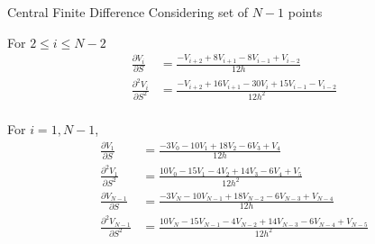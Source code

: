 \documentclass{beamer}
\begin{document}

\begin{frame}{Central Finite Difference}
Considering set of $N-1$ points

\small
For $2 \le i \le N-2$
\begin{align*}
    \frac{\partial V_i}{\partial S} &= \frac{-V_{i+2}+8V_{i+1}-8V_{i-1}+V_{i-2}}{12h}\\
    \frac{\partial^2 V_i}{\partial S^2} &= \frac{-V_{i+2}+16V_{i+1}-30V_i+15V_{i-1}-V_{i-2}}{12h^2}\\
\end{align*}

For $i=1,N-1$,
\begin{align*}
    \frac{\partial V_1}{\partial S} &= \frac{-3V_{0}-10V_{1}+18V_{2}-6V_{3}+V_4}{12h}\\
    \frac{\partial^2 V_1}{\partial S^2} &= \frac{10V_0-15V_1-4V_2+14V_3-6V_4+V_5}{12h^2}\\
    \frac{\partial V_{N-1}}{\partial S}&=\frac{-3 V_{N}-10 V_{N-1}+18 V_{N-2}-6 V_{N-3}+V_{N-4}}{12 h}\\
    \frac{\partial^{2} V_{N-1}}{\partial S^{2}}&=\frac{10 V_{N}-15 V_{N-1}-4 V_{N-2}+14 V_{N-3}-6 V_{N-4}+V_{N-5}}{12 h^{2}}
\end{align*}

\end{frame}




\end{document}
